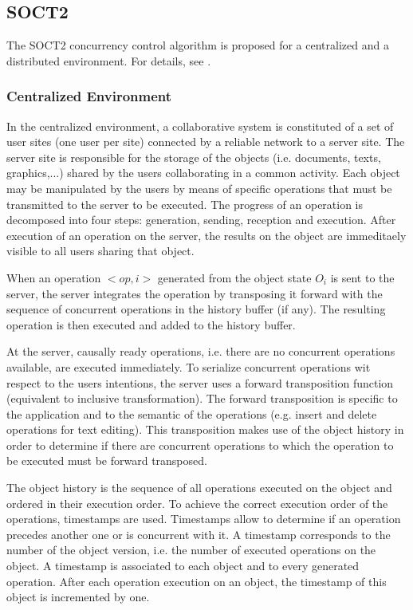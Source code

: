 \subsection{SOCT2}
\label{algo:soct2}

The SOCT2 concurrency control algorithm is proposed for a centralized and a distributed environment. For details, see \cite{imine04}.

\subsubsection{Centralized Environment}
In the centralized environment, a collaborative system is constituted of a set of user sites (one user per site) connected by a reliable network to a server site. The server site is responsible for the storage of the objects (i.e. documents, texts, graphics,...) shared by the users collaborating in a common activity. Each object may be manipulated by the users by means of specific operations that must be transmitted to the server to be executed. The progress of an operation is decomposed into four steps: generation, sending, reception and execution. After execution of an operation on the server, the results on the object are immeditaely visible to all users sharing that object.

When an operation $<op,i>$ generated from the object state $O_{i}$ is sent to the server, the server integrates the operation by transposing it forward with the sequence of concurrent operations in the history buffer (if any). The resulting operation is then executed and added to the history buffer.

At the server, causally ready operations, i.e. there are no concurrent operations available, are executed immediately. To serialize concurrent operations wit respect to the users intentions, the server uses a forward transposition function (equivalent to inclusive transformation). The forward transposition is specific to the application and to the semantic of the operations (e.g. insert and delete operations for text editing). This transposition makes use of the object history in order to determine if there are concurrent operations to which the operation to be executed must be forward transposed.

The object history is the sequence of all operations executed on the object and ordered in their execution order. To achieve the correct execution order of the operations, timestamps are used. Timestamps allow to determine if an operation precedes another one or is concurrent with it. A timestamp corresponds to the number of the object version, i.e. the number of executed operations on the object. A timestamp is associated to each object and to every generated operation. After each operation execution on an object, the timestamp of this object is incremented by one.  

